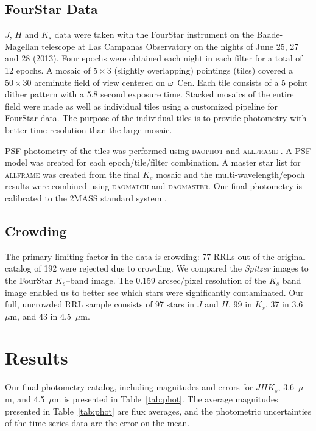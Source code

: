 \documentclass[a4paper,fleqn,usenatbib]{mnras}
\begin{document}
\subsection{FourStar Data}
\label{sec:fourstar_reduction}

$J$, $H$ and $K_s$ data were taken with the FourStar instrument on the Baade-Magellan telescope at Las Campanas Observatory \citep{2013PASP..125..654P} on the nights of June 25, 27 and 28 (2013).  Four epochs were obtained each night in each filter for a total of 12 epochs.  A mosaic of $5\times3$ (slightly overlapping) pointings (tiles) covered a $50\times30$ arcminute field of view centered on $\omega$~Cen.  Each tile consists of a 5 point dither pattern with a 5.8 second exposure time.  Stacked mosaics of the entire field were made as well as individual tiles using a customized pipeline for FourStar data.  The purpose of the individual tiles is to provide photometry with better time resolution than the large mosaic.  

PSF photometry of the tiles was performed using \textsc{daophot} and \textsc{allframe} \citep{1987PASP...99..191S, 1994PASP..106..250S}. A PSF model was created for each epoch/tile/filter combination.  A master star list for \textsc{allframe} was created from the final $K_s$ mosaic and the multi-wavelength/epoch results were combined using \textsc{daomatch} and \textsc{daomaster}.  Our final photometry is calibrated to the 2MASS standard system \citep{2006AJ....131.1163S}. 

\subsection{Crowding}
\label{sec:crowding}

The primary limiting factor in the data is crowding: 77 RRLs out of the original catalog of 192 \citep{2004A&A...424.1101K} were rejected due to crowding. We compared the {\it Spitzer} images to the FourStar $K_s$--band image. The 0.159 arcsec/pixel resolution of the $K_s$ band image enabled us to better see which stars were significantly contaminated. Our full, uncrowded RRL sample consists of 97 stars in $J$ and $H$, 99 in $K_s$, 37 in 3.6~$\mu$m, and 43 in 4.5~$\mu$m.

\section{Results}
\label{sec:results}

Our final photometry catalog, including magnitudes and errors for $J\!H\!K_s$, 3.6~$\mu$m, and 4.5~$\mu$m is presented in Table~\ref{tab:phot}.
The average magnitudes presented in Table~\ref{tab:phot} are flux averages, and the photometric uncertainties of the time series data are the error on the mean.
\end{document}
